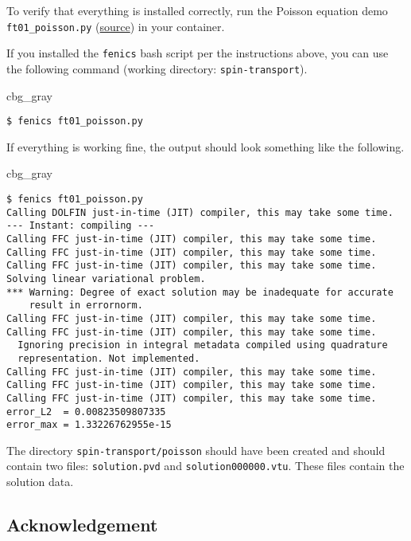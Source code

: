 \documentclass[%
oneside,                 %
final,                   %
10pt]{article}
\newenvironment{_cod_tight}[1]{
   \def\FrameCommand{\colorbox{#1}}
   \FrameRule0.6pt\MakeFramed {\FrameRestore}\vskip3mm}
   {\vskip0mm\endMakeFramed}
\newenvironment{cod}[1]{
\bgroup\rmfamily
\fboxsep=0mm\relax
\begin{_cod_tight}{#1}
\list{}{\parsep=-2mm\parskip=0mm\topsep=0pt\leftmargin=2mm
\rightmargin=2\leftmargin\leftmargin=4pt\relax}
\item\relax}
{\endlist\end{_cod_tight}\egroup}
\begin{document}
To verify that everything is installed correctly, run the Poisson equation demo \Verb!ft01_poisson.py! (\href{{https://fenicsproject.org/pub/tutorial/html/._ftut1004.html}}{source}) in your container.

If you installed the \texttt{fenics} bash script per the instructions above, you can use the following command (working directory: \texttt{spin-transport}).

\begin{cod}{cbg_gray}\begin{verbatim}
$ fenics ft01_poisson.py
\end{verbatim}
\end{cod}
\noindent

If everything is working fine, the output should look something like the following.

\begin{cod}{cbg_gray}\begin{verbatim}
$ fenics ft01_poisson.py
Calling DOLFIN just-in-time (JIT) compiler, this may take some time.
--- Instant: compiling ---
Calling FFC just-in-time (JIT) compiler, this may take some time.
Calling FFC just-in-time (JIT) compiler, this may take some time.
Calling FFC just-in-time (JIT) compiler, this may take some time.
Solving linear variational problem.
*** Warning: Degree of exact solution may be inadequate for accurate 
	result in errornorm.
Calling FFC just-in-time (JIT) compiler, this may take some time.
Calling FFC just-in-time (JIT) compiler, this may take some time.
  Ignoring precision in integral metadata compiled using quadrature 
  representation. Not implemented.
Calling FFC just-in-time (JIT) compiler, this may take some time.
Calling FFC just-in-time (JIT) compiler, this may take some time.
Calling FFC just-in-time (JIT) compiler, this may take some time.
error_L2  = 0.00823509807335
error_max = 1.33226762955e-15
\end{verbatim}
\end{cod}
\noindent

The directory \texttt{spin-transport/poisson} should have been created and should contain two files: \texttt{solution.pvd} and \texttt{solution000000.vtu}.
These files contain the solution data.

\subsection{Acknowledgement}
\end{document}
